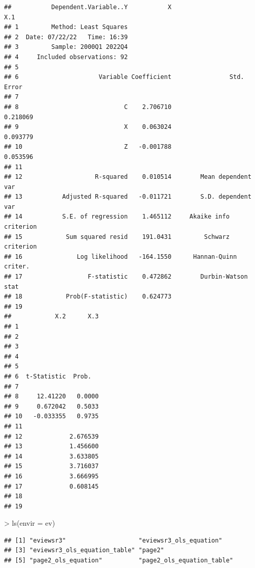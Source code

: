 \documentclass[
]{article}
\newenvironment{Shaded}{\begin{snugshade}}{\end{snugshade}}
\newcommand{\AttributeTok}[1]{\textcolor[rgb]{0.77,0.63,0.00}{#1}}
\newcommand{\FunctionTok}[1]{\textcolor[rgb]{0.00,0.00,0.00}{#1}}
\newcommand{\NormalTok}[1]{#1}
\newcommand{\SpecialCharTok}[1]{\textcolor[rgb]{0.00,0.00,0.00}{#1}}
\begin{document}
\begin{verbatim}
##           Dependent.Variable..Y           X                       X.1
## 1         Method: Least Squares                                      
## 2  Date: 07/22/22   Time: 16:39                                      
## 3         Sample: 2000Q1 2022Q4                                      
## 4     Included observations: 92                                      
## 5                                                                    
## 6                      Variable Coefficient                Std. Error
## 7                                                                    
## 8                             C    2.706710                  0.218069
## 9                             X    0.063024                  0.093779
## 10                            Z   -0.001788                  0.053596
## 11                                                                   
## 12                    R-squared    0.010514        Mean dependent var
## 13           Adjusted R-squared   -0.011721        S.D. dependent var
## 14           S.E. of regression    1.465112     Akaike info criterion
## 15            Sum squared resid    191.0431         Schwarz criterion
## 16               Log likelihood   -164.1550      Hannan-Quinn criter.
## 17                  F-statistic    0.472862        Durbin-Watson stat
## 18            Prob(F-statistic)    0.624773                          
## 19                                                                   
##            X.2      X.3
## 1                      
## 2                      
## 3                      
## 4                      
## 5                      
## 6  t-Statistic  Prob.  
## 7                      
## 8     12.41220   0.0000
## 9     0.672042   0.5033
## 10   -0.033355   0.9735
## 11                     
## 12             2.676539
## 13             1.456600
## 14             3.633805
## 15             3.716037
## 16             3.666995
## 17             0.608145
## 18                     
## 19
\end{verbatim}

\begin{Shaded}
\begin{Highlighting}[]
\SpecialCharTok{\textgreater{}} \FunctionTok{ls}\NormalTok{(}\AttributeTok{envir =}\NormalTok{ ev)}
\end{Highlighting}
\end{Shaded}

\begin{verbatim}
## [1] "eviewsr3"                    "eviewsr3_ols_equation"      
## [3] "eviewsr3_ols_equation_table" "page2"                      
## [5] "page2_ols_equation"          "page2_ols_equation_table"
\end{verbatim}
\end{document}
